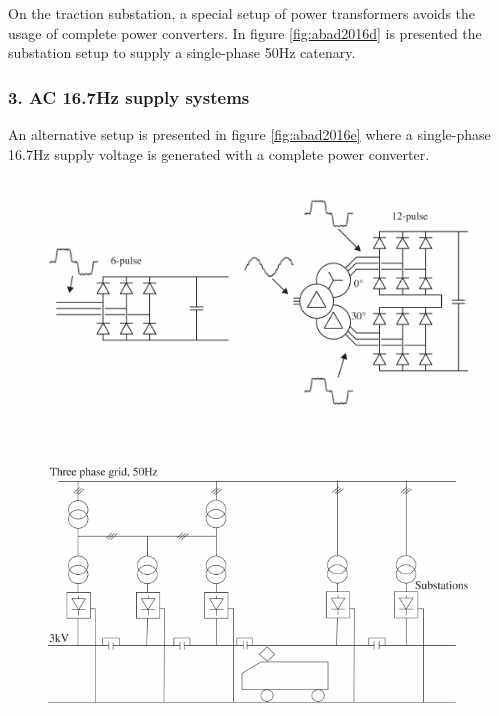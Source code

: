 On the traction substation, a special setup of power transformers avoids the usage of complete power converters. In figure \ref{fig:abad2016d} is presented the substation setup to supply a single-phase 50Hz catenary.

\subsubsection{3. AC 16.7Hz supply systems\\}
An alternative setup is presented in figure \ref{fig:abad2016e} where a single-phase 16.7Hz supply voltage is generated with a complete power converter. 
\begin{figure}[h!]
	\centering
	\begin{minipage}{.45\textwidth}
		\centering
		\includegraphics[width=\textwidth,keepaspectratio]{figures/31.PowerS/abad2016b}
		\label{fig:abad2016b}
	\end{minipage}%
	\begin{minipage}{.03\textwidth}  ~\end{minipage}	
	\begin{minipage}{.375\textwidth}
		\centering
		\includegraphics[width=\textwidth,keepaspectratio]{figures/31.PowerS/abad2016f}
		\label{fig:abad2016f}
	\end{minipage}
\end{figure}


